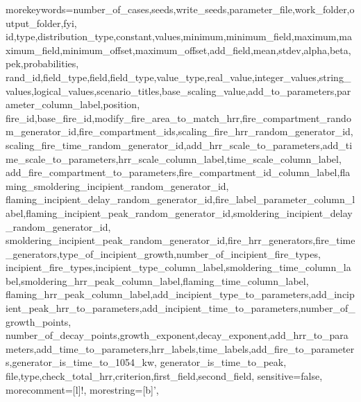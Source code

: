 \usepackage{listings}
\usepackage{textcomp}
\usepackage{footmisc}
 {morekeywords={number_of_cases,seeds,write_seeds,parameter_file,work_folder,output_folder,fyi,
    id,type,distribution_type,constant,values,minimum,minimum_field,maximum,maximum_field,minimum_offset,maximum_offset,add_field,mean,stdev,alpha,beta,pek,probabilities,
    rand_id,field_type,field,field_type,value_type,real_value,integer_values,string_values,logical_values,scenario_titles,base_scaling_value,add_to_parameters,parameter_column_label,position,
    fire_id,base_fire_id,modify_fire_area_to_match_hrr,fire_compartment_random_generator_id,fire_compartment_ids,scaling_fire_hrr_random_generator_id,
        scaling_fire_time_random_generator_id,add_hrr_scale_to_parameters,add_time_scale_to_parameters,hrr_scale_column_label,time_scale_column_label,
        add_fire_compartment_to_parameters,fire_compartment_id_column_label,flaming_smoldering_incipient_random_generator_id,
        flaming_incipient_delay_random_generator_id,fire_label_parameter_column_label,flaming_incipient_peak_random_generator_id,smoldering_incipient_delay_random_generator_id,
        smoldering_incipient_peak_random_generator_id,fire_hrr_generators,fire_time_generators,type_of_incipient_growth,number_of_incipient_fire_types,
        incipient_fire_types,incipient_type_column_label,smoldering_time_column_label,smoldering_hrr_peak_column_label,flaming_time_column_label,
        flaming_hrr_peak_column_label,add_incipient_type_to_parameters,add_incipient_peak_hrr_to_parameters,add_incipient_time_to_parameters,number_of_growth_points,
        number_of_decay_points,growth_exponent,decay_exponent,add_hrr_to_parameters,add_time_to_parameters,hrr_labels,time_labels,add_fire_to_parameters,generator_is_time_to_1054_kw,
        generator_is_time_to_peak,
    file,type,check_total_hrr,criterion,first_field,second_field},
sensitive=false,
morecomment=[l]{!},
morestring=[b]', }
\usepackage{wrapfig}
\usepackage{morefloats}
\usepackage{siunitx}

